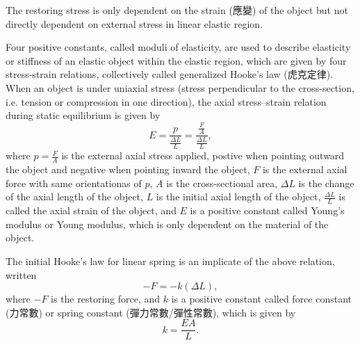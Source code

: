 \documentclass[a4paper,12pt]{article}
\begin{document}
The restoring stress is only dependent on the strain (應變) of the object but not directly dependent on external stress in linear elastic region.

Four positive constants, called moduli of elasticity, are used to describe elasticity or stiffness of an elastic object within the elastic region, which are given by four stress-strain relations, collectively called generalized Hooke's law (虎克定律).
When an object is under uniaxial stress (stress perpendicular to the cross-section, i.e. tension or compression in one direction), the axial stress–strain relation during static equilibrium is given by
\[E=\frac{p}{\frac{\Delta L}{L}}=\frac{\frac{F}{A}}{\frac{\Delta L}{L}},\]
where $p=\frac{F}{A}$ is the external axial stress applied, postive when pointing outward the object and negative when pointing inward the object, $F$ is the external axial force with same orientationas of $p$, $A$ is the cross-sectional area, $\Delta L$ is the change of the axial length of the object, $L$ is the initial axial length of the object, $\frac{\Delta L}{L}$ is called the axial strain of the object, and $E$ is a positive constant called Young's modulus or Young modulus, which is only dependent on the material of the object.

The initial Hooke's law for linear spring is an implicate of the above relation, written
\[-F=-k(\Delta L),\]
where $-F$ is the restoring force, and $k$ is a positive constant called force constant (力常數) or spring constant (彈力常數/彈性常數), which is given by
\[k=\frac{EA}{L}.\]
\end{document}
